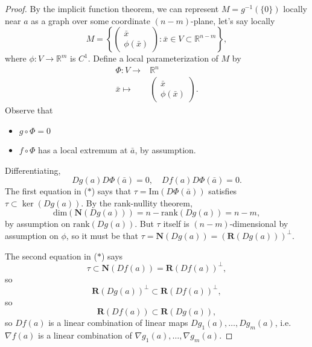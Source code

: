\documentclass[12pt]{article}
\begin{document}
\begin{proof}
	By the implicit function theorem, we can represent $M=g^{-1}(\{0\})$ locally near $a$ as a graph over some coordinate $(n-m)$-plane, let's say locally 
	\begin{equation*}
		M = \left\{ \begin{pmatrix} \bar{x} \\ \phi(\bar{x}) \end{pmatrix} : \bar{x}\in V\subset\mathbb{R}^{n-m}\right\},
	\end{equation*}
	where $\phi:V\to\mathbb{R}^m$ is $C^1$. Define a local parameterization of $M$ by 
	\begin{align*}
		\Phi:V\to& \mathbb{R}^n \\
		\bar{x} \mapsto& \begin{pmatrix} \bar{x} \\ \phi(\bar{x}) \end{pmatrix}.
	\end{align*}
	Observe that 
	\begin{itemize}
		\item $g\circ \Phi=0$
		\item $f\circ\Phi$ has a local extremum at $\bar{a}$, by assumption.
	\end{itemize}
	Differentiating,
	\begin{equation*}
		Dg(a)D\Phi(\bar{a})=0,\quad Df(a)D\Phi(\bar{a})=0. \tag{$\ast$}
	\end{equation*}
	The first equation in ($\ast$) says that $\tau=\text{Im}(D\Phi(\bar{a}))$ satisfies $\tau\subset\ker(Dg(a))$. By the rank-nullity theorem,
	\begin{equation*}
		\text{dim}(\mathbf{N}(Dg(a))) = n - \text{rank}(Dg(a)) = n-m,
	\end{equation*}
	by assumption on $\text{rank}(Dg(a))$. But $\tau$ itself is $(n-m)$-dimensional by assumption on $\phi$, so it must be that $\tau=\mathbf{N}(Dg(a))=(\mathbf{R}(Dg(a)))^\perp$.

	The second equation in ($\ast$) says 
	\begin{equation*}
		\tau\subset\mathbf{N}(Df(a)) = \mathbf{R}(Df(a))^\perp,
	\end{equation*}
	so 
	\begin{equation*}
		\mathbf{R}(Dg(a))^\perp \subset \mathbf{R}(Df(a))^\perp,
	\end{equation*}
	so 
	\begin{equation*}
		\mathbf{R}(Df(a)) \subset \mathbf{R}(Dg(a)),
	\end{equation*}
	so $Df(a)$ is a linear combination of linear maps $Dg_1(a), \dots, Dg_m(a)$, i.e. $\nabla f(a)$ is a linear combination of $\nabla g_1(a),\dots,\nabla g_m(a)$.
\end{proof}
\end{document}
